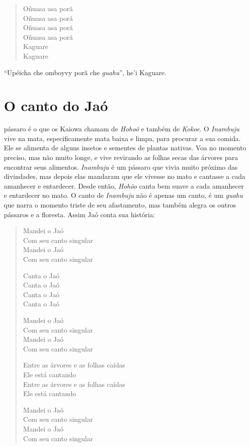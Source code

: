 \begin{verse}
Oñuasa asa porã\\
Oñuasa asa porã\\
Oñuasa asa porã\\
Oñuasa asa porã\\
Kaguare\\
Kaguare
\end{verse}


``Upéicha che omboyvy porã che \textit{guahu}'', he'i Kaguare.


\chapter{O canto do Jaó}

 pássaro é o que os Kaiowa chamam de \textit{Hohoõ} e também de
\textit{Kokoe}. O \textit{Inambuju} vive na mata, especificamente mata baixa e
limpa, para procurar a sua comida. Ele se alimenta de alguns insetos e
sementes de plantas nativas. Voa no momento preciso, mas não muito
longe, e vive revirando as folhas secas das árvores para encontrar seus
alimentos. \textit{Inambuju} é um pássaro que vivia muito próximo das
divindades, mas depois elas mandaram que ele vivesse no mato e cantasse
a cada amanhecer e entardecer. Desde então, \textit{Hohõo} canta bem suave
a cada amanhecer e entardecer no mato. O canto de \textit{Inambuju} não é apenas
um canto, é um \textit{guahu} que narra o momento triste de seu
afastamento, mas também alegra os outros pássaros e a floresta. Assim
Jaó conta sua história:

\begin{verse}
Mandei o Jaó\\
Com seu canto singular\footnotemark{}\\
Mandei o Jaó\\
Com seu canto singular

Canta o Jaó\footnotemark{}\\
Canta o Jaó\\
Canta o Jaó\\
Canta o Jaó

Mandei o Jaó\\
Com seu canto singular\\
Mandei o Jaó\\
Com seu canto singular

Entre as árvores e as folhas caídas\\
Ele está cantando\\
Entre as árvores e as folhas caídas\\
Ele está cantando

Mandei o Jaó\\
Com seu canto singular\\
Mandei o Jaó\\
Com seu canto singular
\end{verse}

